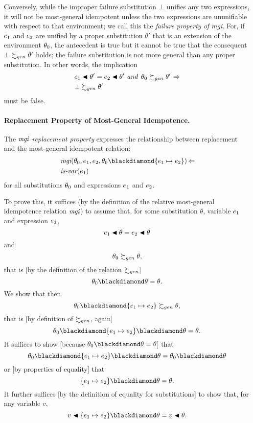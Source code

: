 \documentclass[runningheads]{llncs}
\DeclareMathOperator{\uand}{\emph{and}\,}
\DeclareMathOperator{\uimplies}{\Rightarrow}
\DeclareMathOperator{\uimpliedby}{\Leftarrow}
\DeclareMathOperator{\isvar}{\emph{is-var}}
\DeclareMathOperator{\mgi}{\emph{mgi}}
\begin{document}
   Conversely, while the improper failure substitution $\bot$ unifies any two expressions, it will not be most-general idempotent unless the two expressions are ununifiable with respect to that environment; we call this the \emph{failure property of mgi}.  For, if $e_{1}$ and $e_{2}$ are unified by a proper substitution $\theta'$ that is an extension of the environment $\theta_{0}$, the antecedent is true but
it cannot be true that the consequent $\bot \succsim_{gen} \theta'$ holds;  the failure substitution is not more general than any proper substitution. In other words, the implication
 {\begin {align*} &\e{1} \apply \theta' = \e{2} \apply \theta' \, \uand \,     \thet{0} \moregen \theta' \,\uimplies\\
                    &\fail \moregen \theta'
   \end{align*}}
must be false.
\paragraph{Replacement Property of Most-General Idempotence.}
 The \emph{$\mgi$ replacement property} expresses the relationship between replacement and the most-general idempotent relation:
\[
\begin{aligned}
    &\mgi(\thet{0}, \e{1}, \e{2}, \thet{0} \compose \{\e{1} \mapsto \e{2}\}) \uimpliedby \\
    &\isvar(\e{1})
\end{aligned}
\]
for all substitutions $\theta_{0}$ and expressions $e_{1}$ and $e_{2}$.

To prove this, it suffices (by the definition of the relative most-general idempotence relation $\mgi$) to 
assume that, for some substitution $\theta$, variable $e_{1}$ and expression $e_{2}$, 
\[e_{1} \blacktriangleleft \theta = e_{2} \blacktriangleleft \theta\]
and
\[\theta_{0} \succsim_{gen} \theta,\]
that is [by the definition of the relation $\succsim_{gen}$] 
\[\thet{0} \compose \theta = \theta.\]
We show that then
\[\thet{0} \compose \{\e{1} \mapsto \e{2}\} \moregen \theta,\]
that is [by definition of $\succsim_{gen}$, again]
\[\thet{0} \compose \{\e{1} \mapsto \e{2}\} \compose \theta = \theta .\]
It suffices to show [because $\thet{0} \compose \theta = \theta$] that
\[\thet{0} \compose \{\e{1} \mapsto \e{2}\} \compose \theta = \thet{0} \compose \theta \]
or [by properties of equality] that
\[\{\e{1} \mapsto \e{2}\} \compose \theta = \theta. \]
It further suffices [by the definition of equality for substitutions] to show that, for any variable $v$,
\[v \apply \{\e{1} \mapsto \e{2}\} \compose \theta =  v \apply \theta. \]
\end{document}
